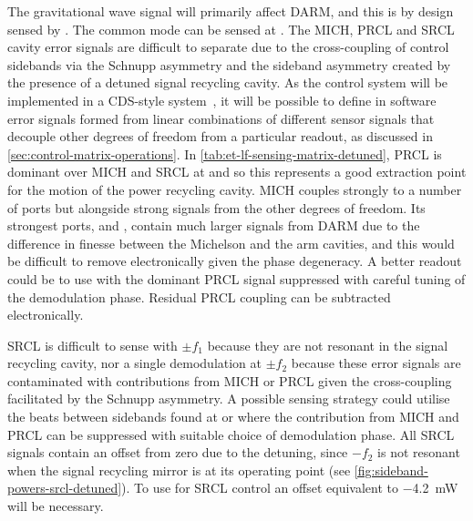 The gravitational wave signal will primarily affect \gls{DARM}, and this is by design sensed by \ASDC{}. The common mode can be sensed at \REFLFIRST{}. The \gls{MICH}, \gls{PRCL} and \gls{SRCL} cavity error signals are difficult to separate due to the cross-coupling of control sidebands via the Schnupp asymmetry and the sideband asymmetry created by the presence of a detuned signal recycling cavity. As the control system will be implemented in a \LIGO{} \gls{CDS}-style system~\cite{Bork2010}, it will be possible to define in software error signals formed from linear combinations of different sensor signals that decouple other degrees of freedom from a particular readout, as discussed in \cref{sec:control-matrix-operations}. In \cref{tab:et-lf-sensing-matrix-detuned}, \gls{PRCL} is dominant over \gls{MICH} and \gls{SRCL} at \POPFIRST{} and so this represents a good extraction point for the motion of the power recycling cavity. \gls{MICH} couples strongly to a number of ports but alongside strong signals from the other degrees of freedom. Its strongest ports, \ASDC{} and \ASSECOND{}, contain much larger signals from \gls{DARM} due to the difference in finesse between the Michelson and the arm cavities, and this would be difficult to remove electronically given the phase degeneracy. A better readout could be to use \POPSECOND{} with the dominant \gls{PRCL} signal suppressed with careful tuning of the demodulation phase. Residual \gls{PRCL} coupling can be subtracted electronically.

\gls{SRCL} is difficult to sense with $\pm f_1$ because they are not resonant in the signal recycling cavity, nor a single demodulation at $\pm f_2$ because these error signals are contaminated with contributions from \gls{MICH} or \gls{PRCL} given the cross-coupling facilitated by the Schnupp asymmetry. A possible sensing strategy could utilise the beats between sidebands found at \REFLDIFF{} or \REFLSUM{} where the contribution from \gls{MICH} and \gls{PRCL} can be suppressed with suitable choice of demodulation phase. All \gls{SRCL} signals contain an offset from zero due to the detuning, since $-f_2$ is not resonant when the signal recycling mirror is at its operating point (see \cref{fig:sideband-powers-srcl-detuned}). To use \REFLSUM{} for \gls{SRCL} control an offset equivalent to \SI{-4.2}{\milli\watt} will be necessary.

